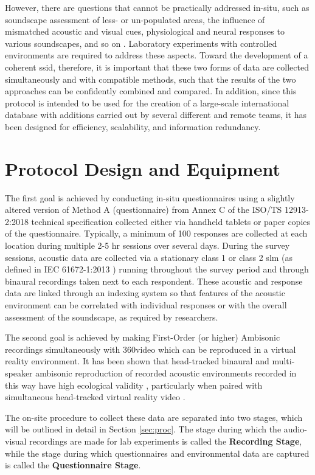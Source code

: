  However, there are questions that cannot be practically addressed in-situ, such as soundscape assessment of less- or un-populated areas, the influence of mismatched acoustic and visual cues, physiological and neural responses to various soundscapes, and so on . Laboratory experiments with controlled environments are required to address these aspects. Toward the development of a coherent \gls{ssid}, therefore, it is important that these two forms of data are collected simultaneously and with compatible methods, such that the results of the two approaches can be confidently combined and compared. In addition, since this protocol is intended to be used for the creation of a large-scale international database with additions carried out by several different and remote teams, it has been designed for efficiency, scalability, and information redundancy.

\section{Protocol Design and Equipment}
 The first goal is achieved by conducting in-situ questionnaires using a slightly altered version of Method A (questionnaire) from Annex C of the ISO/TS 12913-2:2018 technical specification \citep{ISO12913_2_2018IOS} collected either via handheld tablets or paper copies of the questionnaire. Typically, a minimum of 100 responses are collected at each location during multiple 2-5 hr sessions over several days. During the survey sessions, acoustic data are collected via a stationary class 1 or class 2 \gls{slm} (as defined in IEC 61672-1:2013 ) running throughout the survey period and through binaural recordings taken next to each respondent. These acoustic and response data are linked through an indexing system so that features of the acoustic environment can be correlated with individual responses or with the overall assessment of the soundscape, as required by researchers.

 The second goal is achieved by making First-Order (or higher) Ambisonic recordings simultaneously with 360\degree video which can be reproduced in a virtual reality environment. It has been shown that head-tracked binaural and multi-speaker ambisonic reproduction of recorded acoustic environments recorded in this way have high ecological validity , particularly when paired with simultaneous head-tracked virtual reality video .

 The on-site procedure to collect these data are separated into two stages, which will be outlined in detail in Section \ref{sec:proc}. The stage during which the audio-visual recordings are made for lab experiments is called the \textbf{Recording Stage}, while the stage during which questionnaires and environmental data are captured is called the \textbf{Questionnaire Stage}.

